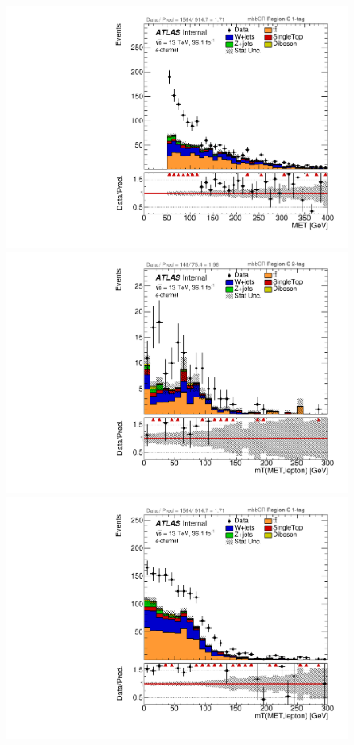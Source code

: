 \begin{figure}[!htbp]
\begin{center}
\includegraphics[scale=0.23]{./figures/boosted/ABCD/elec_mbbcr_RegionC_1tag_MET}\\
\includegraphics[scale=0.23]{./figures/boosted/ABCD/elec_mbbcr_RegionC_WlepMtATLAS}
\includegraphics[scale=0.23]{./figures/boosted/ABCD/elec_mbbcr_RegionC_1tag_WlepMtATLAS}\\

\end{center}
\end{figure}
